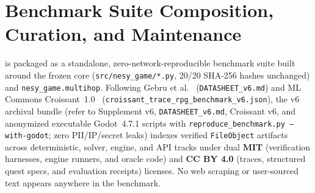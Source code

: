 \section{Benchmark Suite Composition, Curation, and Maintenance}\label{sec:db-composition}
\system{} is packaged as a standalone, zero-network-reproducible benchmark suite built around the frozen core (\texttt{src/nesy\_game/*.py}, 20/20 SHA-256 hashes unchanged) and \texttt{nesy\_game.multihop}. Following Gebru et al.~\cite{gebru2021datasheets} (\texttt{DATASHEET\_v6.md}) and ML Commons Croissant~1.0~\cite{akhtar2024croissant} (\texttt{croissant\_trace\_rpg\_benchmark\_v6.json}), the v6 archival bundle (refer to Supplement v6, \texttt{DATASHEET\_v6.md}, Croissant v6, and anonymized executable Godot~4.7.1 scripts with \texttt{reproduce\_benchmark.py --with-godot}; zero PII/IP/secret leaks) indexes verified \texttt{FileObject} artifacts across deterministic, solver, engine, and API tracks under dual \textbf{MIT} (verification harnesses, engine runners, and oracle code) and \textbf{CC BY 4.0} (traces, structured quest specs, and evaluation receipts) licenses. No web scraping or user-sourced text appears anywhere in the benchmark.


